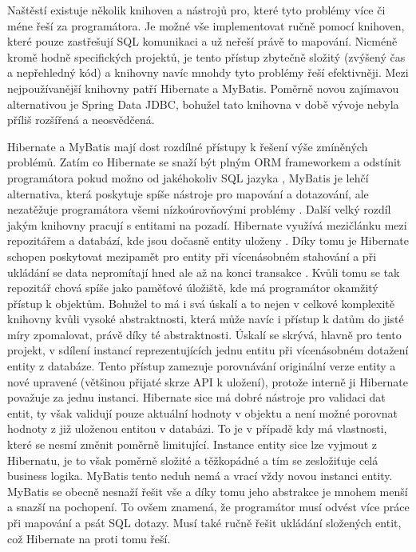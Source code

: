 \begin{itemize}
\begin{itemize}
		Naštěstí existuje několik knihoven a nástrojů pro, které tyto problémy více či méne řeší za programátora.
		Je možné vše implementovat ručně pomocí knihoven, které pouze zastřešují \ac{SQL} komunikaci a už neřeší
		právě to mapování.
		Nicméně kromě hodně specifických projektů, je tento přístup zbytečně složitý (zvýšený čas a nepřehledný kód)
		a knihovny navíc mnohdy tyto problémy řeší efektivněji.
		Mezi nejpoužívanější knihovny patří Hibernate a MyBatis.
		Poměrně novou zajímavou alternativou je Spring Data JDBC, bohužel tato knihovna v době vývoje nebyla příliš
		rozšířená a neosvědčená.

		Hibernate a MyBatis mají dost rozdílné přístupy k řešení výše zmíněných problémů.
		Zatím co Hibernate se snaží být plným \ac{ORM} frameworkem a odstínit programátora pokud možno od jakéhokoliv
		\ac{SQL} jazyka \cite{hibernate_docs}, MyBatis je lehčí alternativa, která poskytuje spíše nástroje pro mapování a dotazování, ale
		nezatěžuje programátora všemi nízkoúrovňovými problémy \cite{mybatis_getting_started}.
		Další velký rozdíl jakým knihovny pracují s entitami na pozadí.
		Hibernate využívá mezičlánku mezi repozitářem a databází, kde jsou dočasně entity uloženy \cite{hibernate_docs}.
		Díky tomu je Hibernate schopen poskytovat mezipamět pro entity při vícenásobném stahování a při ukládání
		se data nepromítají hned ale až na konci transakce \cite{hibernate_docs}.
		Kvůli tomu se tak repozitář chová spíše jako paměťové úložiště, kde má programátor okamžitý přístup k objektům.
		Bohužel to má i svá úskalí a to nejen v celkové komplexitě knihovny kvůli vysoké abstraktnosti, která může navíc
		i přístup k datům do jisté míry zpomalovat, právě díky té abstraktnosti.
		Úskalí se skrývá, hlavně pro tento projekt, v sdílení instancí reprezentujících jednu entitu při vícenásobném
		dotažení entity z databáze.
		Tento přístup zamezuje porovnávání originální verze entity a nové upravené (většinou přijaté skrze \ac{API} k
		uložení), protože interně ji Hibernate považuje za jednu instanci.
		Hibernate sice má dobré nástroje pro validaci dat entit, ty však validují pouze aktuální hodnoty v objektu a
		není možné porovnat hodnoty z již uloženou entitou v databázi.
		To je v případě kdy má vlastnosti, které se nesmí změnit poměrně limitující.
		Instance entity sice lze vyjmout z Hibernatu, je to však poměrně složité a těžkopádné a tím se zesložiťuje
		celá business logika.
		MyBatis tento neduh nemá a vrací vždy novou instanci entity.
		MyBatis se obecně nesnaží řešit vše a díky tomu jeho abstrakce je mnohem menší a snazší na pochopení.
		To ovšem znamená, že programátor musí odvést více práce při mapování a psát \ac{SQL} dotazy.
		Musí také ručně řešit ukládání složených entit, což Hibernate na proti tomu řeší.


\end{itemize}
\end{itemize}
